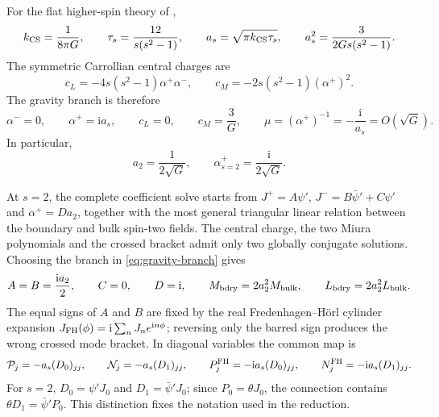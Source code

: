 \documentclass[11pt,a4paper]{article}
\numberwithin{equation}{section}
\theoremstyle{remark}
\newcommand{\ii}{\mathrm{i}}
\begin{document}
For the flat higher-spin theory of \cite{DArcyDelfanteFredenhagen},
\begin{equation}
 k_{\rm CS}=\frac1{8\pi G},\qquad
 \tau_s=\frac{12}{s(s^2-1)},\qquad
 a_s=\sqrt{\pi k_{\rm CS}\tau_s},
 \qquad
 a_s^2=\frac{3}{2Gs(s^2-1)}.
 \label{eq:bulk-normalization}
\end{equation}
The symmetric Carrollian central charges are
\begin{equation}
 c_L=-4s(s^2-1)\alpha^+\alpha^-,
 \qquad
 c_M=-2s(s^2-1)(\alpha^+)^2.
 \label{eq:central-charges}
\end{equation}
The gravity branch is therefore
\begin{equation}
 \alpha^-=0,\qquad \alpha^+=\ii a_s,\qquad c_L=0,\qquad c_M=\frac3G,
 \qquad \mu=(\alpha^+)^{-1}=-\frac{\ii}{a_s}=O(\sqrt G).
 \label{eq:gravity-branch}
\end{equation}
In particular,
\begin{equation}
 a_2=\frac1{2\sqrt G},\qquad \alpha^+_{s=2}=\frac{\ii}{2\sqrt G}.
 \label{eq:N2-alpha}
\end{equation}

At $s=2$, the complete coefficient solve starts from
$J^+=A\psi'$, $J^-=B\bar\psi'+C\psi'$ and $\alpha^+=Da_2$, together with the most general
triangular linear relation between the boundary and bulk spin-two fields.  The central charge,
the two Miura polynomials and the crossed bracket admit only two globally conjugate solutions.
Choosing the branch in \cref{eq:gravity-branch} gives
\begin{equation}
 A=B=\frac{\ii a_2}{2},\qquad C=0,\qquad D=\ii,\qquad
 M_{\rm bdry}=2a_2^2M_{\rm bulk},\qquad
 L_{\rm bdry}=2a_2^2L_{\rm bulk}.
 \label{eq:N2-solve}
\end{equation}
The equal signs of $A$ and $B$ are fixed by the real Fredenhagen--H\"orl cylinder expansion
$J_{\rm FH}(\phi)=\ii\sum_nJ_ne^{\ii n\phi}$; reversing only the barred sign produces the wrong
crossed mode bracket.  In diagonal variables the common map is
\begin{equation}
 \mathcal P_j=-a_s(D_0)_{jj},\qquad \mathcal N_j=-a_s(D_1)_{jj},\qquad
 P_j^{\rm FH}=-\ii a_s(D_0)_{jj},\qquad N_j^{\rm FH}=-\ii a_s(D_1)_{jj}.
 \label{eq:diagonal-current-map}
\end{equation}
For $s=2$, $D_0=\psi'J_0$ and $D_1=\bar\psi'J_0$; since $P_0=\theta J_0$, the connection
contains $\theta D_1=\bar\psi'P_0$.  This distinction fixes the notation used in the reduction.
\end{document}

